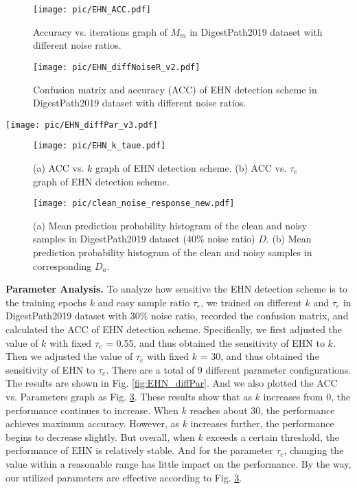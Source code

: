 \begin{figure}[]
  \centering
  \texttt{[image: pic/EHN\_ACC.pdf]}
\caption{{Accuracy vs. iterations graph of $M_m$ in DigestPath2019 dataset with different noise ratios.}}
  \label{fig:ehn_acc}
\end{figure}

\begin{figure}[]
  \centering
  \texttt{[image: pic/EHN\_diffNoiseR\_v2.pdf]}
\caption{{Confusion matrix and accuracy (ACC) of EHN detection scheme in DigestPath2019 dataset with different noise ratios.}}
  \label{fig:EHN_diffNoiseR}
\end{figure}



\begin{figure*}[]
  \centering
  \texttt{[image: pic/EHN\_diffPar\_v3.pdf]}
\caption{{Confusion matrix and accuracy (ACC) of EHN detection scheme on different ``{$k$}'' and ``$\tau_e$'' in DigestPath2019 dataset with 30\% noise ratio.}}
  \label{fig:EHN_diffPar}
\end{figure*}

\begin{figure}[]
  \centering
  \texttt{[image: pic/EHN\_k\_taue.pdf]}
\caption{{(a) ACC vs. {$k$} graph of EHN detection scheme. (b) ACC vs. $\tau_e$ graph of EHN detection scheme.}}
  \label{fig:EHN_n}
\end{figure}

\begin{figure}[]
  \centering
  \texttt{[image: pic/clean\_noise\_response\_new.pdf]}
\caption{{(a) Mean prediction probability histogram of the clean and noisy samples in DigestPath2019 dataset (40\% noise ratio) $D$. (b) Mean prediction probability histogram of the clean and noisy samples in corresponding $D_a$. }}
  \label{fig:clean_noise}
\end{figure}

\textbf{{Parameter Analysis.}} {To analyze how sensitive the EHN detection scheme is to the training epochs {$k$} and easy sample ratio $\tau_e$, we trained on different {$k$} and $\tau_e$ in DigestPath2019 dataset with 30\% noise ratio, recorded the confusion matrix, and calculated the ACC of EHN detection scheme. Specifically, we first adjusted the value of {$k$} with fixed $\tau_e$ = 0.55, and thus obtained the sensitivity of EHN to {$k$}. Then we adjusted the value of $\tau_e$ with fixed {$k$} = 30, and thus obtained the sensitivity of EHN to $\tau_e$. There are a total of 9 different parameter configurations. The results are shown in Fig. \ref{fig:EHN_diffPar}. And we also plotted the ACC vs. Parameters graph as Fig. \ref{fig:EHN_n}. These results show that as {$k$} increases from 0, the performance continues to increase. When {$k$} reaches about 30, the performance achieves maximum accuracy. However, as {$k$} increases further, the performance begins to decrease slightly. But overall, when {$k$} exceeds a certain threshold, the performance of EHN is relatively stable. And for the parameter $\tau_e$, changing the value within a reasonable range has little impact on the performance. By the way, our utilized parameters are effective according to Fig. \ref{fig:EHN_n}.}



